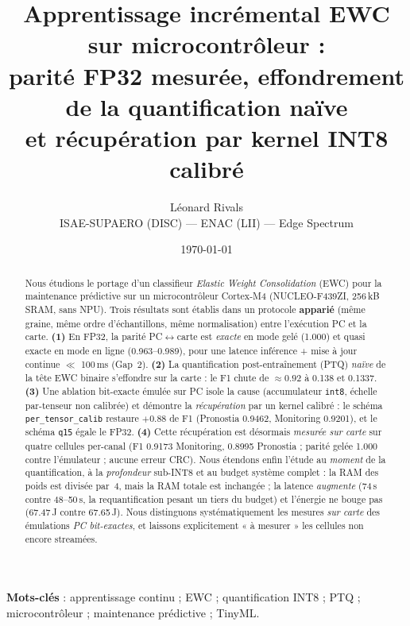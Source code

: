 \documentclass[11pt,a4paper]{article}
\title{Apprentissage incrémental EWC sur microcontrôleur :\\
parité FP32 mesurée, effondrement de la quantification naïve\\
et récupération par kernel INT8 calibré}
\author{Léonard Rivals\\
\small ISAE-SUPAERO (DISC) --- ENAC (LII) --- Edge Spectrum}
\date{\today}
\providecommand{\num}[1]{#1}
\providecommand{\numrange}[2]{#1--#2}
\providecommand{\SI}[2]{#1\,#2}
\providecommand{\SIrange}[3]{#1--#2\,#3}
\providecommand{\micro}{\textmu}
\providecommand{\second}{s}
\providecommand{\milli}{m}
\providecommand{\kilo}{k}
\providecommand{\byte}{B}
\providecommand{\joule}{J}
\begin{document}
\maketitle

\begin{abstract}
Nous étudions le portage d'un classifieur \emph{Elastic Weight Consolidation} (EWC) pour la
maintenance prédictive sur un microcontrôleur Cortex-M4 (NUCLEO-F439ZI, \SI{256}{\kilo\byte} SRAM,
sans NPU). Trois résultats sont établis dans un protocole \textbf{apparié} (même graine, même ordre
d'échantillons, même normalisation) entre l'exécution PC et la carte. \textbf{(1)} En FP32, la parité
PC$\leftrightarrow$carte est \emph{exacte} en mode gelé (\num{1.000}) et quasi exacte en mode en ligne
(\numrange{0.963}{0.989}), pour une latence inférence + mise à jour continue $\ll$ \SI{100}{\milli\second}
(Gap~2). \textbf{(2)} La quantification post-entraînement (PTQ) \emph{naïve} de la tête EWC binaire
s'effondre sur la carte : le F1 chute de $\approx\!\num{0.92}$ à \num{0.138} et \num{0.1337}. \textbf{(3)} Une
ablation bit-exacte émulée sur PC isole la cause (accumulateur \texttt{int8}, échelle par-tenseur
non calibrée) et démontre la \emph{récupération} par un kernel calibré : le schéma
\texttt{per\_tensor\_calib} restaure $+\!\num{0.88}$ de F1 (Pronostia \num{0.9462}, Monitoring \num{0.9201}),
et le schéma \texttt{q15} égale le FP32. \textbf{(4)} Cette récupération est désormais \emph{mesurée sur
carte} sur quatre cellules per-canal (F1 \num{0.9173} Monitoring, \num{0.8995} Pronostia ; parité gelée
\num{1.000} contre l'émulateur ; aucune erreur CRC). Nous étendons enfin l'étude au \emph{moment} de la
quantification, à la \emph{profondeur} sub-INT8 et au budget système complet : la RAM des poids est divisée
par~4, mais la RAM totale est inchangée ; la latence \emph{augmente} (\SI{74}{\micro\second} contre
\SIrange{48}{50}{\micro\second}, la requantification pesant un tiers du budget) et l'énergie ne bouge pas
(\SI{67.47}{\micro\joule} contre \SI{67.65}{\micro\joule}). Nous distinguons systématiquement les mesures
\emph{sur carte} des émulations \emph{PC bit-exactes}, et laissons explicitement « à mesurer » les cellules
non encore streamées.
\end{abstract}

\noindent\textbf{Mots-clés} : apprentissage continu ; EWC ; quantification INT8 ; PTQ ; microcontrôleur ;
maintenance prédictive ; TinyML.










\end{document}
